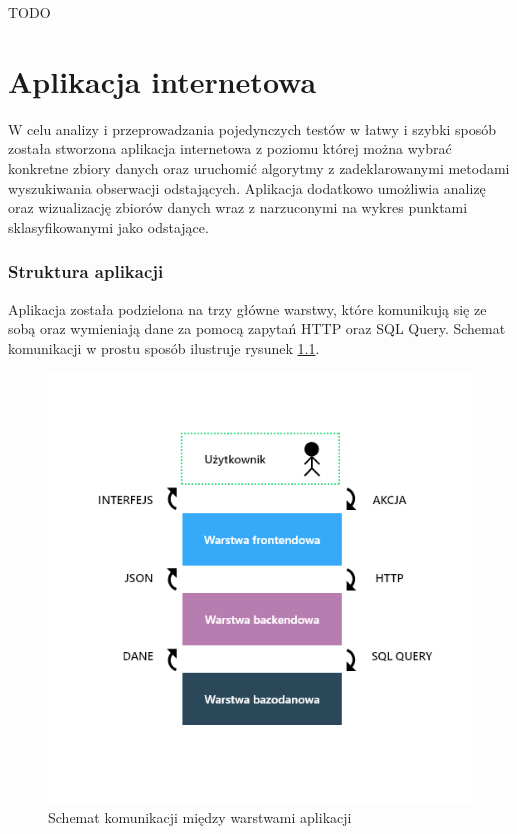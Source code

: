 \documentclass[eng,printmode]{mgr}
\begin{document}
TODO

\chapter{Aplikacja internetowa}
W celu analizy i przeprowadzania pojedynczych testów w łatwy i szybki sposób została stworzona aplikacja internetowa z poziomu której można wybrać konkretne zbiory danych oraz uruchomić algorytmy z zadeklarowanymi metodami wyszukiwania obserwacji odstających. Aplikacja dodatkowo umożliwia analizę oraz wizualizację zbiorów danych wraz z narzuconymi na wykres punktami sklasyfikowanymi jako odstające.
\subsection{Struktura aplikacji}
Aplikacja została podzielona na trzy główne warstwy, które komunikują się ze sobą oraz wymieniają dane za pomocą zapytań HTTP oraz SQL Query. Schemat komunikacji w prostu sposób ilustruje rysunek \ref{fig:layers}.

\begin{figure}[H]
  \begin{center}
  \includegraphics[scale=0.7]{layers}
  \end{center}
  \caption{Schemat komunikacji między warstwami aplikacji}
  \label{fig:layers}
\end{figure}
\end{document}
